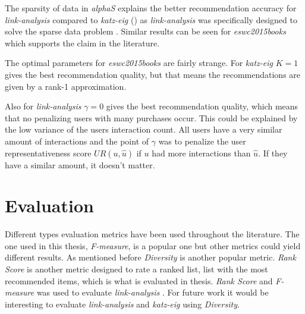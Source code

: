 The sparsity of data in \textit{alphaS} explains the better recommendation accuracy for \textit{link-analysis} compared to \textit{katz-eig} () as \textit{link-analysis} was specifically designed to solve the sparse data problem \citep{huang2004link, huang2007comparison}. Similar results can be seen for \textit{eswc2015books} which supports the claim in the literature.

The optimal parameters for \textit{eswc2015books} are fairly strange. For \textit{katz-eig} $K = 1$ gives the best recommendation quality, but that means the recommendations are given by a rank-1 approximation.

Also for \textit{link-analysis} $\gamma = 0$ gives the best recommendation quality, which means that no penalizing users with many purchases occur. This could be explained by the low variance of the users interaction count. All users have a very similar amount of interactions and the point of $\gamma$ was to penalize the user representativeness score $UR(u, \hat{u})$ if $u$ had more interactions than $\hat{u}$. If they have a similar amount, it doesn't matter.


\section{Evaluation}

Different types evaluation metrics have been used throughout the literature. The one used in this thesis, \textit{F-measure}, is a popular one but other metrics could yield different results. As mentioned before \textit{Diversity} is another popular metric.  \textit{Rank Score} \cite{huang2007comparison} is another metric designed to rate a ranked list, list with the most recommended items, which is what is evaluated in thesis. \textit{Rank Score} and \textit{F-measure} was used to evaluate \textit{link-analysis} \cite{huang2007comparison}. For future work it would be interesting to evaluate \textit{link-analysis} and \textit{katz-eig} using \textit{Diversity}.






